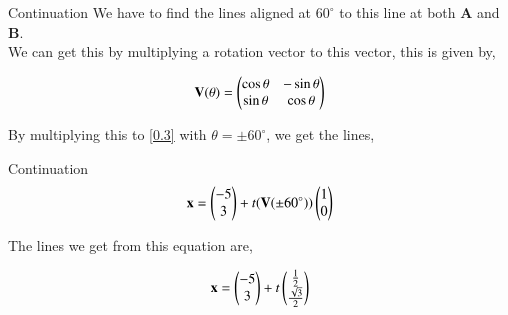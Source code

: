 \documentclass{beamer}
\begin{document}
\begin{frame}{Continuation}
We have to find the lines aligned at $60^{\circ}$ to this line at both \textbf{A} and \textbf{B}.\\
We can get this by multiplying a rotation vector to this vector, this is given by,

\begin{align}
    \textbf{V}(\theta) = \begin{pmatrix}\cos\theta & -\sin\theta \\\sin\theta & \cos\theta\end{pmatrix}
    \label{0.4}
\end{align}

By multiplying this to \ref{0.3} with $\theta = \pm 60^{\circ}$, we get the lines,

\end{frame}
\begin{frame}{Continuation}
\begin{align}
    \textbf{x} = \begin{pmatrix}-5\\3\end{pmatrix} + t(\textbf{V}(\pm 60^{\circ}))\begin{pmatrix}1\\0\end{pmatrix}
    \label{0.5}
\end{align}

The lines we get from this equation are,

\begin{align}
    \textbf{x} = \begin{pmatrix}-5\\3\end{pmatrix}+t\begin{pmatrix}\frac{1}{2}\\\frac{\sqrt{3}}{2}\end{pmatrix}
    \label{0.6}
\end{align}
\end{frame}
\end{document}
